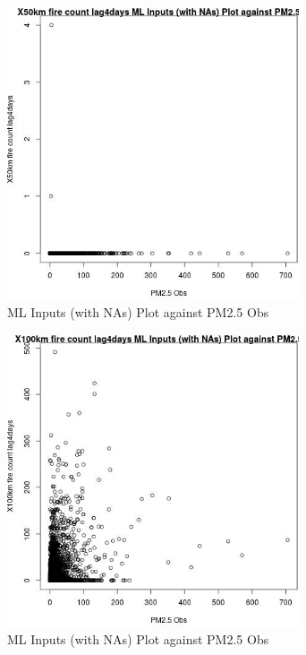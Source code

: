 \begin{figure} 
\centering  
\includegraphics[width=0.77\textwidth]{Code_Outputs/Report_ML_input_PM25_Step4_part_e_de_duplicated_aves_compiled_2019-05-14wNAs_X50km_fire_count_lag4daysvPM25_Obs.jpg} 
\caption{\label{fig:Report_ML_input_PM25_Step4_part_e_de_duplicated_aves_compiled_2019-05-14wNAsX50km_fire_count_lag4daysvPM25_Obs}ML Inputs (with NAs) Plot against PM2.5 Obs} 
\end{figure} 
 

\clearpage 

\begin{figure} 
\centering  
\includegraphics[width=0.77\textwidth]{Code_Outputs/Report_ML_input_PM25_Step4_part_e_de_duplicated_aves_compiled_2019-05-14wNAs_X100km_fire_count_lag4daysvPM25_Obs.jpg} 
\caption{\label{fig:Report_ML_input_PM25_Step4_part_e_de_duplicated_aves_compiled_2019-05-14wNAsX100km_fire_count_lag4daysvPM25_Obs}ML Inputs (with NAs) Plot against PM2.5 Obs} 
\end{figure} 
 

